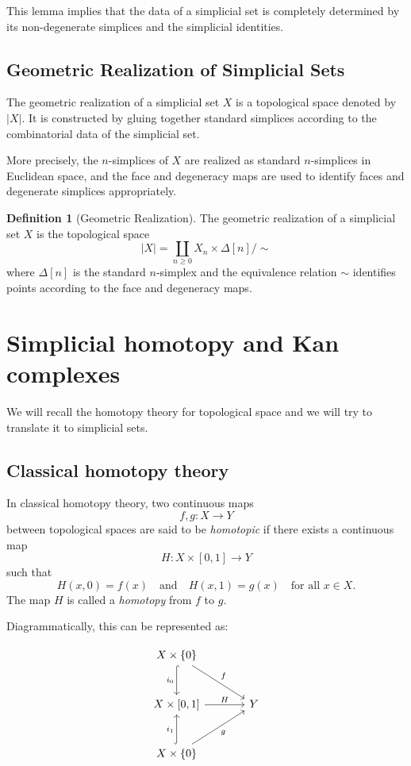 \documentclass[11pt]{article}
\theoremstyle{definition}
\newtheorem{definition}{Definition}[section]
\theoremstyle{plain}
\begin{document}
This lemma implies that the data of a simplicial set is completely determined by its non-degenerate simplices and the simplicial identities.


\subsection{Geometric Realization of Simplicial Sets}
The geometric realization of a simplicial set $X$ is a topological space denoted by $|X|$. It is constructed by gluing together standard simplices according to the combinatorial data of the simplicial set.

More precisely, the $n$-simplices of $X$ are realized as standard $n$-simplices in Euclidean space, and the face and degeneracy maps are used to identify faces and degenerate simplices appropriately.

\begin{definition}[Geometric Realization]
    The geometric realization of a simplicial set $X$ is the topological space
    \[
        |X| = \coprod_{n \geq 0} X_n \times \Delta[n] / \sim
    \]
    where $\Delta[n]$ is the standard $n$-simplex and the equivalence relation $\sim$ identifies points according to the face and degeneracy maps.
\end{definition}





\section{Simplicial homotopy and Kan complexes}
We will recall the homotopy theory for topological space and we will try to translate it to simplicial sets.

\subsection{Classical homotopy theory}
In classical homotopy theory, two continuous maps
\[
    f,g : X \to Y
\]
between topological spaces are said to be \emph{homotopic} if there exists a continuous map
\[
    H : X \times [0,1] \to Y
\]
such that
\[
    H(x,0) = f(x) \quad \text{and} \quad H(x,1) = g(x) \quad \text{for all } x \in X.
\]
The map $H$ is called a \emph{homotopy} from $f$ to $g$.

Diagrammatically, this can be represented as:

\[
    \begin{tikzcd}[row sep=large, column sep=large]
        X \times \{0\} \arrow[d,hook,"i_0"'] \arrow[dr,"f"] & \\
        X \times [0,1] \arrow[r,"H"] & Y \\
        X \times \{0\} \arrow[u,hook,"i_1"] \arrow[ur,"g"'] &
    \end{tikzcd}
\]
\end{document}
